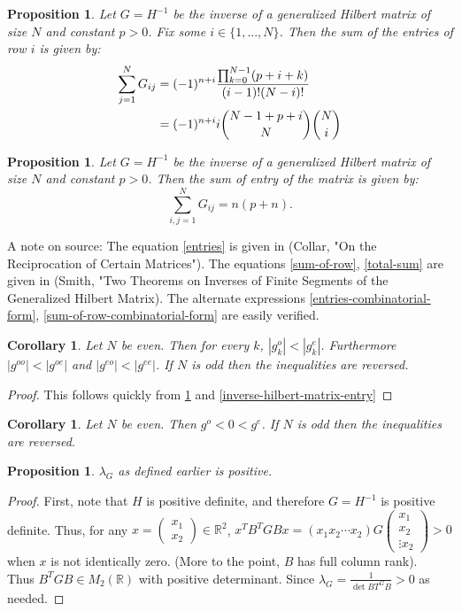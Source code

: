 \documentclass[11pt]{article}
\newtheorem{cor}[thm]{Corollary}
\newtheorem{prop}[thm]{Proposition}
\theoremstyle{definition}
\theoremstyle{remark}
\numberwithin{equation}{section}
\begin{document}
\begin{prop}\label{inverse-hilbert-matrix-row}
Let $G=H^{-1}$ be the inverse of a generalized Hilbert matrix of size $N$ and constant $p>0$. Fix some $i \in \{1,...,N\}$. Then the sum of the entries of row $i$ is given by: 
\begin{align}\label{sum-of-row}
\sum_{j=1}^N G_{ij} &= (-1)^{n+i} \frac{\prod_{k=0}^{N-1} (p+i+k)}{(i-1)! (N-i)!} \\
&= (-1)^{n+i} i \dbinom{N-1+p+i}{N} \dbinom{N}{i} \label{sum-of-row-combinatorial-form}
\end{align}
\end{prop}

\begin{prop}\label{inverse-hilbert-matrix-total} 
Let $G=H^{-1}$ be the inverse of a generalized Hilbert matrix of size $N$ and constant $p>0$. Then the sum of entry of the matrix is given by:
\begin{equation}\label{total-sum}
\sum_{i,j=1}^N G_{ij} = n(p+n).
\end{equation}
\end{prop} 
A note on source: The equation \ref{entries} is given in (Collar, "On the Reciprocation of Certain Matrices"). The equations \ref{sum-of-row}, \ref{total-sum} are given in (Smith, "Two Theorems on Inverses of Finite Segments of the Generalized Hilbert Matrix). The alternate expressions \ref{entries-combinatorial-form}, \ref{sum-of-row-combinatorial-form} are easily verified. 

\begin{cor}
Let $N$ be even. Then for every $k$,  $|g_k^o| < |g_k^e|$. Furthermore $|g^{oo}| < |g^{oe}|$ and $|g^{eo}| < |g^{ee}|$.  If $N$ is odd then the inequalities are reversed. 
\end{cor}
\begin{proof}
This follows quickly from \ref{inverse-hilbert-matrix-row} and \ref{inverse-hilbert-matrix-entry}
\end{proof}

\begin{cor}
Let $N$ be even. Then $g^o < 0 < g^e$. If $N$ is odd then the inequalities are reversed.
\end{cor}

\begin{prop}\label{inverse-determinant-is-positive}
$\lambda_G$ as defined earlier is positive.
\end{prop}
\begin{proof}
First, note that $H$ is positive definite, and therefore $G=H^{-1}$ is positive definite. Thus, for any $x= \begin{pmatrix} x_1 \\ x_2 \end{pmatrix} \in \mathbb{R}^2$, $x^T B^TGBx = (x_1 x_2 \cdots x_2) G \begin{pmatrix} x_1 \\ x_2 \\ \vdots x_2 \end{pmatrix} > 0$ when $x$ is not identically zero. (More to the point, $B$ has full column rank). \\
Thus $B^TGB \in M_2(\mathbb{R})$ with positive determinant. Since $\lambda_G = \frac{1}{\det BT^GB} >0 $ as needed.
\end{proof}
\end{document}
